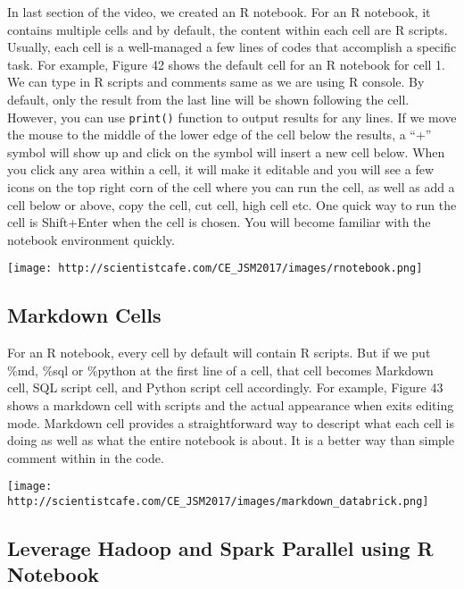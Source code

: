 \documentclass[
]{article}
\begin{document}
In last section of the video, we created an R notebook. For an R
notebook, it contains multiple cells and by default, the content within
each cell are R scripts. Usually, each cell is a well-managed a few
lines of codes that accomplish a specific task. For example, Figure 42
shows the default cell for an R notebook for cell 1. We can type in R
scripts and comments same as we are using R console. By default, only
the result from the last line will be shown following the cell. However,
you can use \texttt{print()} function to output results for any lines.
If we move the mouse to the middle of the lower edge of the cell below
the results, a ``+'' symbol will show up and click on the symbol will
insert a new cell below. When you click any area within a cell, it will
make it editable and you will see a few icons on the top right corn of
the cell where you can run the cell, as well as add a cell below or
above, copy the cell, cut cell, high cell etc. One quick way to run the
cell is Shift+Enter when the cell is chosen. You will become familiar
with the notebook environment quickly.

\texttt{[image: http://scientistcafe.com/CE\_JSM2017/images/rnotebook.png]}

\hypertarget{markdown-cells}{%
\subsection{Markdown Cells}\label{markdown-cells}}

For an R notebook, every cell by default will contain R scripts. But if
we put \%md, \%sql or \%python at the first line of a cell, that cell
becomes Markdown cell, SQL script cell, and Python script cell
accordingly. For example, Figure 43 shows a markdown cell with scripts
and the actual appearance when exits editing mode. Markdown cell
provides a straightforward way to descript what each cell is doing as
well as what the entire notebook is about. It is a better way than
simple comment within in the code.

\texttt{[image: http://scientistcafe.com/CE\_JSM2017/images/markdown\_databrick.png]}

\hypertarget{leverage-hadoop-and-spark-parallel-using-r-notebook}{%
\subsection{Leverage Hadoop and Spark Parallel using R
Notebook}\label{leverage-hadoop-and-spark-parallel-using-r-notebook}}
\end{document}
